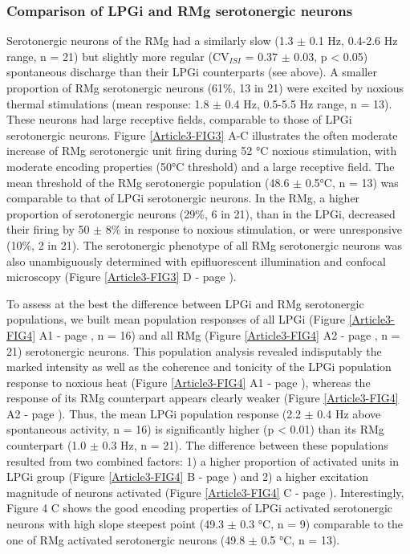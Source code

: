 \documentclass[a4paper,12pt,twoside]{report}
\begin{document}
\begin{figure}[p]
\label{Article3-FIG2}

\end{figure}

\subsubsection{Comparison of LPGi and RMg serotonergic neurons}

Serotonergic neurons of the RMg had a similarly slow (1.3 $\pm$ 0.1 Hz, 0.4-2.6 Hz range, n = 21) but slightly more regular (CV$_{ISI}$ = 0.37 $\pm$ 0.03, p < 0.05) spontaneous discharge than their LPGi counterparts (see above). A smaller proportion of RMg serotonergic neurons (61\%, 13 in 21) were excited by noxious thermal stimulations (mean response: 1.8 $\pm$ 0.4 Hz, 0.5-5.5 Hz range, n = 13). These neurons had large receptive fields, comparable to those of LPGi serotonergic neurons. Figure \ref{Article3-FIG3} A-C illustrates the often moderate increase of RMg serotonergic unit firing during 52 °C noxious stimulation, with moderate encoding properties (50°C threshold) and a large receptive field. The mean threshold of the RMg serotonergic population (48.6 $\pm$ 0.5°C, n = 13) was comparable to that of LPGi serotonergic neurons. In the RMg, a higher proportion of serotonergic neurons (29\%, 6 in 21), than in the LPGi, decreased their firing by 50 $\pm$ 8\% in response to noxious stimulation, or were unresponsive (10\%, 2 in 21). The serotonergic phenotype of all RMg serotonergic neurons was also unambiguously determined with epifluorescent illumination and confocal microscopy (Figure \ref{Article3-FIG3} D - page \pageref{Article3-FIG3}).

To assess at the best the difference between LPGi and RMg serotonergic populations, we built mean population responses of all LPGi (Figure \ref{Article3-FIG4} A1 - page \pageref{Article3-FIG4}, n = 16) and all RMg (Figure \ref{Article3-FIG4} A2 - page \pageref{Article3-FIG4}, n = 21) serotonergic neurons. This population analysis revealed indisputably the marked intensity as well as the coherence and tonicity of the LPGi population response to noxious heat (Figure \ref{Article3-FIG4} A1 - page \pageref{Article3-FIG4}), whereas the response of its RMg counterpart appears clearly weaker (Figure \ref{Article3-FIG4} A2 - page \pageref{Article3-FIG4}). Thus, the mean LPGi population response (2.2 $\pm$ 0.4 Hz above spontaneous activity, n = 16) is significantly higher (p < 0.01) than its RMg counterpart (1.0 $\pm$ 0.3 Hz, n = 21). The difference between these populations resulted from two combined factors: 1) a higher proportion of activated units in LPGi group (Figure \ref{Article3-FIG4} B - page \pageref{Article3-FIG4}) and 2) a higher excitation magnitude of neurons activated (Figure \ref{Article3-FIG4} C - page \pageref{Article3-FIG4}). Interestingly, Figure 4 C shows the good encoding properties of LPGi activated serotonergic neurons with high slope steepest point (49.3 $\pm$ 0.3 °C, n = 9) comparable to the one of RMg activated serotonergic neurons (49.8 $\pm$ 0.5 °C, n = 13).
\end{document}
